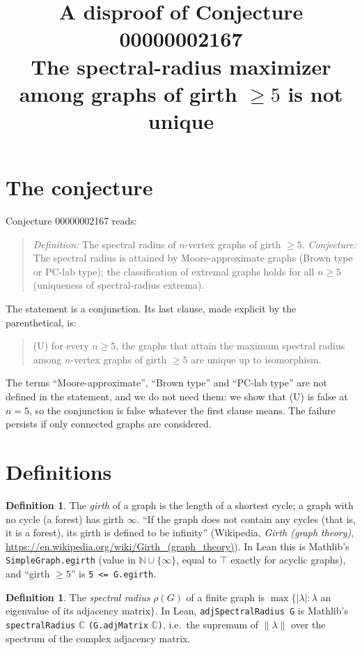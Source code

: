 \documentclass[11pt]{article}
\title{A disproof of Conjecture 00000002167\\[2pt]
\large The spectral-radius maximizer among graphs of girth $\ge 5$ is not unique}
\date{}
\theoremstyle{definition}
\newtheorem{definition}[theorem]{Definition}
\theoremstyle{remark}
\renewcommand{\_}{\oldus\allowbreak}
\newcommand{\C}{\mathbb{C}}
\begin{document}
\sloppy
\maketitle

\section{The conjecture}

Conjecture 00000002167 reads:

\begin{quote}
\emph{Definition:} The spectral radius of $n$-vertex graphs of girth $\ge 5$. \emph{Conjecture:} The spectral
radius is attained by Moore-approximate graphs (Brown type or PC-lab type); the classification of extremal
graphs holds for all $n\ge5$ (uniqueness of spectral-radius extrema).
\end{quote}

\noindent The statement is a conjunction. Its last clause, made explicit by the parenthetical, is:
\begin{quote}
(U) for every $n\ge5$, the graphs that attain the maximum spectral radius among $n$-vertex graphs of girth
$\ge5$ are unique up to isomorphism.
\end{quote}
The terms ``Moore-approximate'', ``Brown type'' and ``PC-lab type'' are not defined in the statement, and we
do not need them: we show that (U) is false at $n=5$, so the conjunction is false whatever the first clause
means. The failure persists if only connected graphs are considered.

\section{Definitions}

\begin{definition}
The \emph{girth} of a graph is the length of a shortest cycle; a graph with no cycle (a forest) has girth
$\infty$. ``If the graph does not contain any cycles (that is, it is a forest), its girth is defined to be
infinity'' (Wikipedia, \emph{Girth (graph theory)},
\url{https://en.wikipedia.org/wiki/Girth_(graph_theory)}). In Lean this is Mathlib's
\texttt{SimpleGraph.egirth} (value in $\mathbb N\cup\{\infty\}$, equal to $\top$ exactly for acyclic graphs),
and ``girth $\ge5$'' is \texttt{5 <= G.egirth}.
\end{definition}

\begin{definition}
The \emph{spectral radius} $\rho(G)$ of a finite graph is $\max\{|\lambda| : \lambda$ an eigenvalue of its
adjacency matrix$\}$. In Lean, \texttt{adjSpectralRadius G} is Mathlib's
\texttt{spectralRadius} $\C$ \texttt{(G.adjMatrix} $\C$\texttt{)}, i.e.\ the supremum of $\|\lambda\|$ over
the spectrum of the complex adjacency matrix.
\end{definition}
\end{document}
